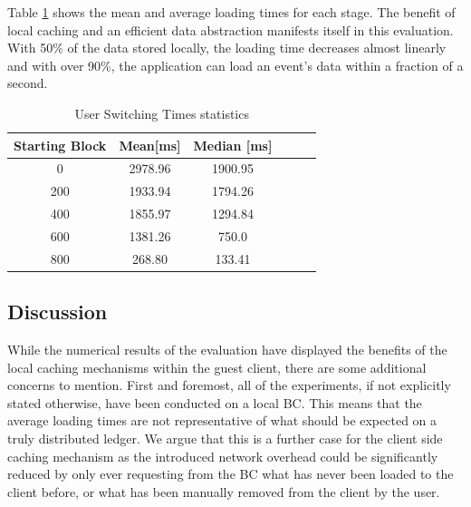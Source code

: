 Table \ref{tab:caching} shows the mean and average loading times for each stage. The benefit of local caching and an efficient data abstraction manifests itself in this evaluation. With 50\% of the data stored locally, the loading time decreases almost linearly and with over 90\%, the application can load an event's data within a fraction of a second.
 
\begin{table}[ht]
\centering
\begin{tabular}{|c|c|c|c|c|c|}
\hline
\textbf{Starting Block} & \textbf{Mean[ms]} & \textbf{Median [ms]} \\ \hline
0   & 2978.96         & 1900.95    \\ \hline
200 & 1933.94         &  1794.26   \\ \hline
400 & 1855.97         &  1294.84    \\ \hline
600 & 1381.26         &  750.0    \\ \hline
800 & 268.80          &  133.41     \\ \hline
\end{tabular}
\caption{User Switching Times statistics}
\label{tab:caching}
\end{table}

\subsection{Discussion}\label{section:eval-discussion}

While the numerical results of the evaluation have displayed the benefits of the local caching mechanisms within the guest client, there are some additional concerns to mention. First and foremost, all of the experiments, if not explicitly stated otherwise, have been conducted on a local BC. This means that the average loading times are not representative of what should be expected on a truly distributed ledger. We argue that this is a further case for the client side caching mechanism as the introduced network overhead could be significantly reduced by only ever requesting from the BC what has never been loaded to the client before, or what has been manually removed from the client by the user.  
